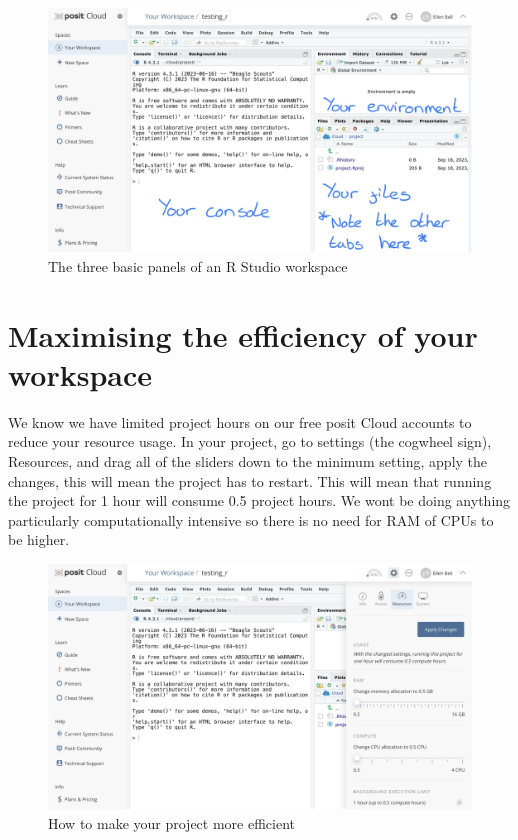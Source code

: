 \documentclass[
]{book}
\begin{document}
\begin{figure}
\includegraphics[width=0.9\linewidth]{figures/posit4} \caption{The three basic panels of an R Studio workspace}\label{fig:unnamed-chunk-4}
\end{figure}

\section{Maximising the efficiency of your workspace}\label{maximising-the-efficiency-of-your-workspace}

We know we have limited project hours on our free posit Cloud accounts to reduce your resource usage. In your project, go to settings (the cogwheel sign), Resources, and drag all of the sliders down to the minimum setting, apply the changes, this will mean the project has to restart. This will mean that running the project for 1 hour will consume 0.5 project hours. We wont be doing anything particularly computationally intensive so there is no need for RAM of CPUs to be higher.

\begin{figure}
\includegraphics[width=0.9\linewidth]{figures/posit5} \caption{How to make your project more efficient}\label{fig:unnamed-chunk-5}
\end{figure}
\end{document}
